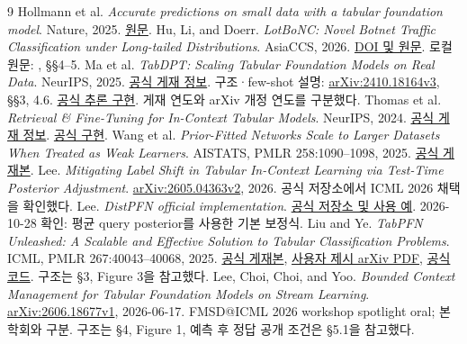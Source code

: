 \begin{thebibliography}{9}\small
{} Hollmann et al. \emph{Accurate predictions on small data with a tabular foundation model}. Nature, 2025. \href{https://www.nature.com/articles/s41586-024-08328-6}{원문}.
 Hu, Li, and Doerr. \emph{LotBoNC: Novel Botnet Traffic Classification under Long-tailed Distributions}. AsiaCCS, 2026. \href{https://doi.org/10.1145/3779208.3785276}{DOI 및 원문}. 로컬 원문: , §§4--5.
 Ma et al. \emph{TabDPT: Scaling Tabular Foundation Models on Real Data}. NeurIPS, 2025. \href{https://proceedings.neurips.cc/paper_files/paper/2025/hash/fc0e3f908a2116ba529ad0a1530a3675-Abstract-Conference.html}{공식 게재 정보}. 구조·few-shot 설명: \href{https://arxiv.org/html/2410.18164v3}{arXiv:2410.18164v3}, §§3, 4.6. \href{https://github.com/layer6ai-labs/TabDPT-inference}{공식 추론 구현}. 게재 연도와 arXiv 개정 연도를 구분했다.
 Thomas et al. \emph{Retrieval \& Fine-Tuning for In-Context Tabular Models}. NeurIPS, 2024. \href{https://papers.nips.cc/paper_files/paper/2024/hash/c40daf14d7a6469e65116507c21faeb7-Abstract-Conference.html}{공식 게재 정보}. \href{https://github.com/layer6ai-labs/LoCalPFN}{공식 구현}.
 Wang et al. \emph{Prior-Fitted Networks Scale to Larger Datasets When Treated as Weak Learners}. AISTATS, PMLR 258:1090--1098, 2025. \href{https://proceedings.mlr.press/v258/wang25d.html}{공식 게재본}.
 Lee. \emph{Mitigating Label Shift in Tabular In-Context Learning via Test-Time Posterior Adjustment}. \href{https://arxiv.org/html/2605.04363}{arXiv:2605.04363v2}, 2026. 공식 저장소에서 ICML 2026 채택을 확인했다.
 Lee. \emph{DistPFN official implementation}. \href{https://github.com/seunghan96/DistPFN}{공식 저장소 및 사용 예}. 2026-10-28 확인: 평균 query posterior를 사용한 기본 보정식.
 Liu and Ye. \emph{TabPFN Unleashed: A Scalable and Effective Solution to Tabular Classification Problems}. ICML, PMLR 267:40043--40068, 2025. \href{https://proceedings.mlr.press/v267/liu25cn.html}{공식 게재본}, \href{https://arxiv.org/pdf/2502.02527}{사용자 제시 arXiv PDF}, \href{https://github.com/LAMDA-Tabular/BETA}{공식 코드}. 구조는 §3, Figure 3을 참고했다.
 Lee, Choi, Choi, and Yoo. \emph{Bounded Context Management for Tabular Foundation Models on Stream Learning}. \href{https://arxiv.org/abs/2606.18677}{arXiv:2606.18677v1}, 2026-06-17. FMSD@ICML 2026 workshop spotlight oral; 본학회와 구분. 구조는 §4, Figure 1, 예측 후 정답 공개 조건은 §5.1을 참고했다.
\end{thebibliography}


